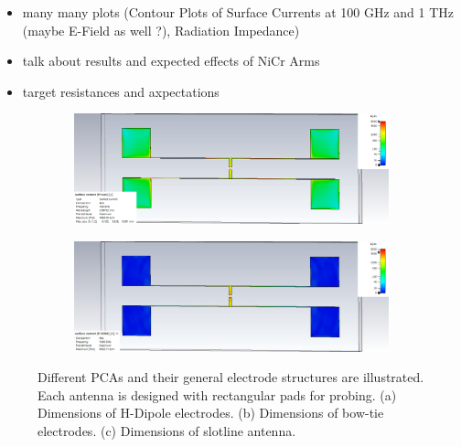 \begin{itemize}
	\item many many plots (Contour Plots of Surface Currents at 100 GHz and 1 THz (maybe E-Field as well ?),
	Radiation Impedance)
	\item talk about results and expected effects of NiCr Arms 
	\item target resistances and axpectations
\end{itemize}

\begin{figure}[h]
    \centering
    \hfill
    \begin{subfigure}[b]{1\textwidth}
        \centering
        \includegraphics[width=\textwidth]{figures/contour_plots/Contour_ref_0.1THz_SC.pdf}
        \caption{}
        \label{contour_ref_100GHz}
    \end{subfigure}
    \hfill
    \begin{subfigure}[b]{1\textwidth}
        \centering
        \includegraphics[width=\textwidth]{figures/contour_plots/Contour_ref_1THz_SC.pdf}
        \caption{}
        \label{contour_ref_1THz}
    \end{subfigure}
    \caption{Different PCAs and their general electrode structures are illustrated. Each antenna is designed with rectangular pads for probing. (a) Dimensions of H-Dipole electrodes. (b) Dimensions of bow-tie electrodes. (c) Dimensions of slotline antenna.}
    \label{electrodes_main}
\end{figure}


